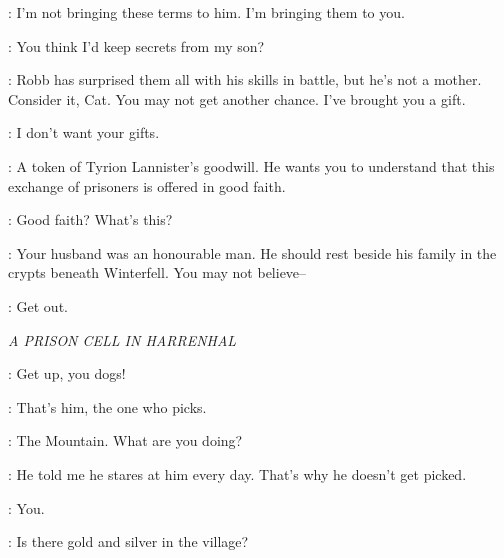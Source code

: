 \LITTLEFINGER: I'm not bringing these terms to him. I'm bringing them to you. 

\CATELYN: You think I'd keep secrets from my son? 

\LITTLEFINGER: Robb has surprised them all with his skills in battle, but he's not a mother. Consider it, Cat. You may not get another chance. I've brought you a gift. 

\CATELYN: I don't want your gifts. 

\LITTLEFINGER: A token of Tyrion Lannister's goodwill. He wants you to understand that this exchange of prisoners is offered in good faith. 


\CATELYN: Good faith? What's this? 


\LITTLEFINGER: Your husband was an honourable man. He should rest beside his family in the crypts beneath Winterfell. You may not believe-- 

\CATELYN: Get out. 



\scene

\textit{A PRISON CELL IN HARRENHAL} 


\POLLIVER: Get up, you dogs! 


\HOTPIE: That's him, the one who picks. 


\ARYA: The Mountain. What are you doing? 


\HOTPIE: He told me he stares at him every day. That's why he doesn't get picked. 

\MOUNTAIN:  You. 



\TICKLER: Is there gold and silver in the village? 

